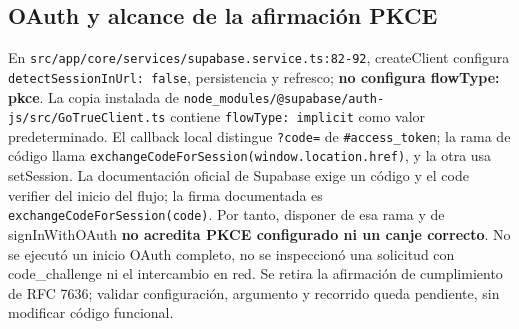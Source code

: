 \documentclass[11pt,a4paper]{article}
\begin{document}
\subsection{OAuth y alcance de la afirmación PKCE}
En \nolinkurl{src/app/core/services/supabase.service.ts:82-92}, createClient configura
\texttt{detectSessionInUrl: false}, persistencia y refresco; \textbf{no configura flowType: \textquotesingle pkce\textquotesingle}.
La copia instalada de \nolinkurl{node_modules/@supabase/auth-js/src/GoTrueClient.ts}
contiene \texttt{flowType: \textquotesingle implicit\textquotesingle} como valor predeterminado. El callback local distingue
\texttt{?code=} de \texttt{\#access\_token}; la rama de código llama
\texttt{exchangeCodeForSession(window.location.href)}, y la otra usa setSession.
La documentación oficial de Supabase exige un código y el code verifier del inicio del flujo;
la firma documentada es \texttt{exchangeCodeForSession(code)}. Por tanto, disponer de esa
rama y de signInWithOAuth \textbf{no acredita PKCE configurado ni un canje correcto}.
No se ejecutó un inicio OAuth completo, no se inspeccionó una solicitud con code\_challenge
ni el intercambio en red. Se retira la afirmación de cumplimiento de RFC 7636; validar
configuración, argumento y recorrido queda pendiente, sin modificar código funcional.
\end{document}
